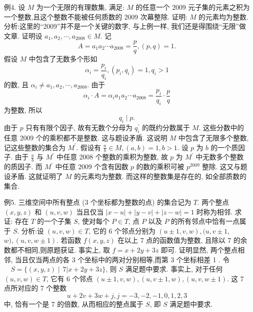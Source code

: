 例4. 设 $M$ 为一个无限的有理数集, 满足: $M$ 的任意一个 2009 元子集的元素之积为一个整数,且这个整数不能被任何质数的 2009 次幕整除.
证明: $M$ 的元素均为整数.
分析:这里的“2009”并不是一个关键的数字, 与上例一样, 我们还是得围绕“无限”做文章.
证明设 $a_1, a_2, \cdots, a_{2008} \in M$. 记
$$
A=a_1 a_2 \cdots a_{2008}=\frac{p}{q},(p, q)=1 .
$$
假设 $M$ 中包含了无数多个形如
$$
\alpha_i=\frac{p_i}{q_i},\left(p_i, q_i\right)=1, q_i>1
$$
的数, 且 $\alpha_i \neq a_1, a_2, \cdots, a_{2008}$. 由于
$$
\alpha_i \cdot A=\alpha_i a_1 a_2 \cdots a_{2008}=\frac{p_i}{q_i} \cdot \frac{p}{q}
$$
为整数, 所以
$$
q_i \mid p .
$$
由于 $p$ 只有有限个因子, 故有无数个分母为 $q_i^{\prime}$ 的既约分数属于 $M$. 这些分数中的任意 2009 个的乘积都不是整数.
这与题设矛盾.
这说明 $M$ 中包含了无限多个整数, 记这些整数的集合为 $M^{\prime}$.
假设有 $\frac{a}{b} \in M,(a, b)=1, b>1$.
设 $p$ 为 $b$ 的一个质因子.
由于 $\frac{a}{b}$ 与 $M^{\prime}$ 中任意 2008 个整数的乘积为整数, 故 $p$ 为 $M^{\prime}$ 中无数多个整数的质因子.
而 $M^{\prime}$ 中任意 2009 个含有因数 $p$ 的数的乘积可被 $p^{2009}$ 整除.
这又与题设矛盾.
这就证明了 $M$ 的元素均为整数.
而这样的整数集是存在的, 如全部质数的集合.



例5. 三维空间中所有整点 (3 个坐标都为整数的点) 的集合记为 $T$. 两个整点 $(x, y, z)$ 和 $(u, v, w)$ 当且仅当 $|x-u|+|y-v|+|z-w|=1$ 时称为相邻.
求证: 存在 $T$ 的一个子集 $S$, 使对每个 $P \in T$, 点 $P$ 以及 $P$ 的所有邻点中恰有一点属于 $S$.
分析:设 $(u, v, w) \in T$, 它的 6 个邻点分别为 $(u \pm 1, v, w),(u, v \pm 1$, $w),(u, v, w \pm 1)$. 若函数 $f(x, y, z)$ 在以上 7 点的函数值为整数, 且除以 7 的余数都不相同,则原题获证.
事实上, 取 $f=x+2 y+3 z$ 即可.
证明显然, 两个整点相邻, 当且仅当两点的各 3 个坐标中的两对分别相等,而第 3 个坐标相差 1 .
令 $\quad S=\{(x, y, z)\mid \, 7 | x+2 y+3 z\}$,
则 $S$ 满足题中要求.
事实上, 对于任何 $(u, v, w) \in T$, 它有 6 个邻点 $(u \pm 1, v, w),(u, v \pm 1, w),(u, v, w \pm 1)$. 这 7 点所对应的 7 个整数
$$
u+2 v+3 w+j, j=-3,-2,-1,0,1,2,3
$$
中, 恰有一个是 7 的倍数, 从而相应的整点属于 $S$, 即 $S$ 满足题中要求.



